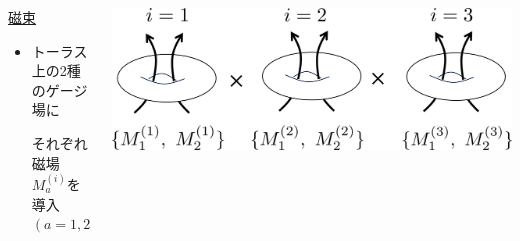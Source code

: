 \documentclass[aspectratio=169,
  a4paper,uplatex,dvipdfmx,11pt,
  xcolor = {dvipsnames,svgnames},
  hyperref ={colorlinks=true,citecolor=Navy,linkcolor=NavyBlue,urlcolor=purple}
]{beamer}
\begin{document}
\begin{frame}
  \begin{columns}[t]    
    \begin{column}{0.5\textwidth} 
      \uline{磁束}
      \begin{itemize}
        \item 
        トーラス上の2種のゲージ場に
        \vspace*{-5pt}
        \begin{flushright}
          それぞれ磁場$M_{a}^{(i)}$を導入    
          \\     
          $(a=1,2)$      
        \end{flushright}
      \end{itemize}
    \end{column}
    \begin{column}{0.48\textwidth} 
      \vspace*{-15pt}
      \includegraphics[width=1.0\textwidth]{fig/torus/tori_fluxed.png}
    \end{column}
  \end{columns}

\end{frame}
\end{document}
